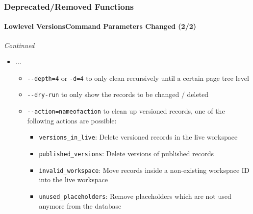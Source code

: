 \begin{frame}[fragile]
	\frametitle{Deprecated/Removed Functions}
	\framesubtitle{Lowlevel VersionsCommand Parameters Changed (2/2)}

	\small\textit{Continued}\normalsize

	\begin{itemize}
		\item ...
			\begin{itemize}
				\item \texttt{-}\texttt{-depth=4} or \texttt{-d=4} to only clean recursively until a certain page tree level
				\item \texttt{-}\texttt{-dry-run} to only show the records to be changed / deleted
				\item \texttt{-}\texttt{-action=nameofaction} to clean up versioned records,
					one of the following actions are possible:
					\begin{itemize}
						\item \texttt{versions\_in\_live}: Delete versioned records in the live workspace
						\item \texttt{published\_versions}: Delete versions of published records
						\item \texttt{invalid\_workspace}: Move records inside a non-existing workspace ID into the live workspace
						\item \texttt{unused\_placeholders}: Remove placeholders which are not used anymore from the database
					\end{itemize}
			\end{itemize}
	\end{itemize}

\end{frame}


